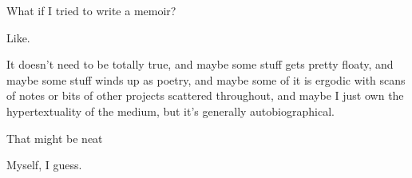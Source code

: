 What if I tried to write a memoir?

Like.

It doesn't need to be totally true, and maybe some stuff gets pretty floaty, and maybe some stuff winds up as poetry, and maybe some of it is ergodic with scans of notes or bits of other projects scattered throughout, and maybe I just own the hypertextuality of the medium, but it's generally autobiographical.

That might be neat


Myself, I guess.


\newpage
